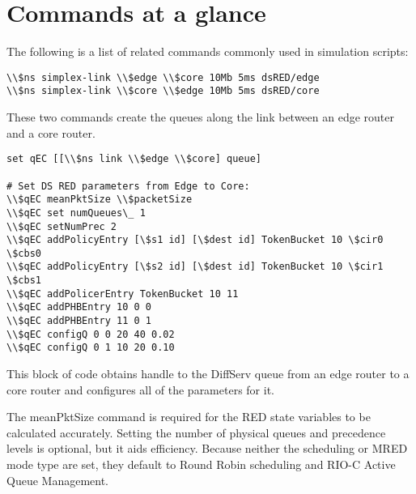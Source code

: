 \section{Commands at a glance}
\label{sec:diffservcommand}

The following is a list of related commands commonly used in
  simulation scripts:

\begin{verbatim}
\\$ns simplex-link \\$edge \\$core 10Mb 5ms dsRED/edge
\\$ns simplex-link \\$core \\$edge 10Mb 5ms dsRED/core
\end{verbatim}

These two commands create the queues along 
  the link between an edge router and a core router.

\begin{verbatim}
set qEC [[\\$ns link \\$edge \\$core] queue]

# Set DS RED parameters from Edge to Core:
\\$qEC meanPktSize \\$packetSize
\\$qEC set numQueues\_ 1
\\$qEC setNumPrec 2
\\$qEC addPolicyEntry [\$s1 id] [\$dest id] TokenBucket 10 \$cir0 \$cbs0
\\$qEC addPolicyEntry [\$s2 id] [\$dest id] TokenBucket 10 \$cir1 \$cbs1
\\$qEC addPolicerEntry TokenBucket 10 11
\\$qEC addPHBEntry 10 0 0
\\$qEC addPHBEntry 11 0 1
\\$qEC configQ 0 0 20 40 0.02
\\$qEC configQ 0 1 10 20 0.10
\end{verbatim}

This block of code obtains handle to the DiffServ queue 
  from an edge router to a core router and 
  configures all of the parameters for it.

The meanPktSize command is required for the RED state variables to be 
  calculated accurately.  
Setting the number of physical queues and precedence levels is optional, 
  but it aids efficiency. 
Because neither the scheduling or MRED mode type are set, 
  they default to Round Robin scheduling and RIO-C Active Queue Management.

